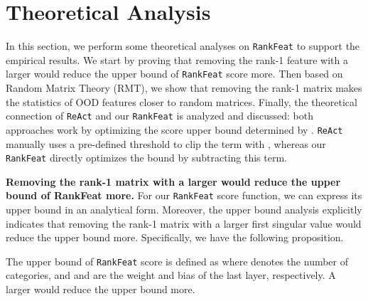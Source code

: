 \section{Theoretical Analysis}
\label{sec:theory}

In this section, we perform some theoretical analyses on \texttt{RankFeat} to support the empirical results. We start by proving that removing the rank-1 feature with a larger  would reduce the upper bound of \texttt{RankFeat} score more. Then based on Random Matrix Theory (RMT), we show that removing the rank-1 matrix makes the statistics of OOD features closer to random matrices. Finally, the theoretical connection of \texttt{ReAct} and our \texttt{RankFeat} is analyzed and discussed: both approaches work by optimizing the score upper bound determined by . \texttt{ReAct} manually uses a pre-defined threshold to clip the term with , whereas our \texttt{RankFeat} directly optimizes the bound by subtracting this term.



\noindent \textbf{Removing the rank-1 matrix with a larger  would reduce the upper bound of RankFeat more.} For our \texttt{RankFeat} score function, we can express its upper bound in an analytical form. Moreover, the upper bound analysis explicitly indicates that removing the rank-1 matrix with a larger first singular value would reduce the upper bound more. Specifically, we have the following proposition.

\begin{prop}
The upper bound of \texttt{RankFeat} score is defined as  where  denotes the number of categories, and  and  are the weight and bias of the last layer, respectively. A larger  would reduce the upper bound more.
\end{prop}

